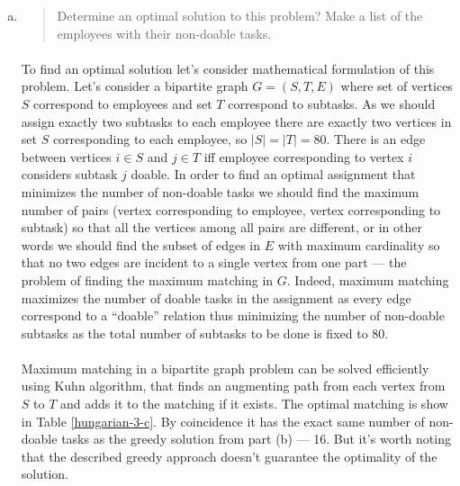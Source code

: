 \begin{enumerate}[(a)]
\item\begin{quote}Determine an optimal solution to this problem? Make a list of the employees with
their non-doable tasks.\end{quote}

	\paragraph{}
	To find an optimal solution let's consider mathematical formulation of this problem. Let's consider a bipartite graph $G=(S,T,E)$ where set of vertices $S$ correspond to employees and set $T$ correspond to subtasks. As we should assign exactly two subtasks to each employee there are exactly two vertices in set $S$ corresponding to each employee, so $|S|=|T|=80$. There is an edge between vertices $i\in S$ and $j \in T$ iff employee corresponding to vertex $i$ considers subtask $j$ doable. In order to find an optimal assignment that minimizes the number of non-doable tasks we should find the maximum number of pairs (vertex corresponding to employee, vertex corresponding to subtask) so that all the vertices among all pairs are different, or in other words we should find the subset of edges in $E$ with maximum cardinality so that no two edges are incident to a single vertex from one part --- the problem of finding the maximum matching in $G$. Indeed, maximum matching maximizes the number of doable tasks in the assignment as every edge correspond to a ``doable'' relation thus minimizing the number of non-doable subtasks as the total number of subtasks to be done is fixed to 80.

	\paragraph{}
	Maximum matching in a bipartite graph problem can be solved efficiently using Kuhn algorithm, that finds an augmenting path from each vertex from $S$ to $T$ and adds it to the matching if it exists. The optimal matching is show in Table \ref{hungarian-3-c}. By coincidence it has the exact same number of non-doable tasks as the greedy solution from part (b) --- 16. But it's worth noting that the described greedy approach doesn't guarantee the optimality of the solution.


\end{enumerate}
